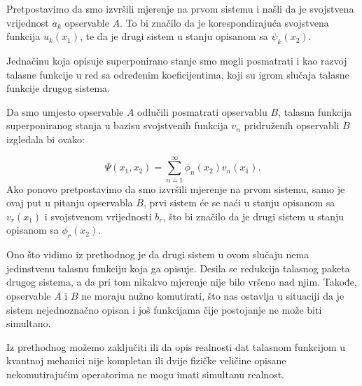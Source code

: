 Pretpostavimo da smo izvršili mjerenje na prvom sistemu i našli da je svojstvena vrijednost $a_k$ opservable $A$. To bi značilo da je korespondirajuća svojstvena funkcija $u_k(x_1)$, te da je drugi sistem u stanju opisanom sa $\psi_k(x_2)$.

Jednačinu koja opisuje superponirano stanje smo mogli posmatrati i kao razvoj talasne funkcije u red sa određenim koeficijentima, koji su igrom slučaja talasne funkcije drugog sistema.

Da smo umjesto opservable $A$ odlučili posmatrati opservablu $B$, talasna funkcija superponiranog stanja u bazisu svojstvenih funkcija $v_n$ pridruženih opservabli $B$ izgledala bi ovako:

\begin{equation}
    \Psi(x_1, x_2) = \sum_{n=1}^{\infty} \phi_n(x_2)v_n(x_1).
\end{equation}
Ako ponovo pretpostavimo da smo izvršili mjerenje na prvom sistemu, samo je ovaj put u pitanju opservabla $B$, prvi sistem će se naći u stanju opisanom sa $v_r(x_1)$ i svojstvenom vrijednosti $b_r$, što bi značilo da je drugi sistem u stanju opisanom sa $\phi_r(x_2)$.

Ono što vidimo iz prethodnog je da drugi sistem u ovom slučaju nema jedinstvenu talasnu funkciju koja ga opisuje. Desila se redukcija talasnog paketa drugog sistema, a da pri tom nikakvo mjerenje nije bilo vršeno nad njim. Takođe, opservable $A$ i $B$ ne moraju nužno komutirati, što nas ostavlja u situaciji da je sistem nejednoznačno opisan i još funkcijama čije postojanje ne može biti simultano.


Iz prethodnog možemo zaključiti ili da opis realnosti dat talasnom funkcijom u kvantnoj mehanici nije kompletan
ili dvije fizičke veličine opisane nekomutirajućim operatorima ne mogu imati simultanu realnost.

